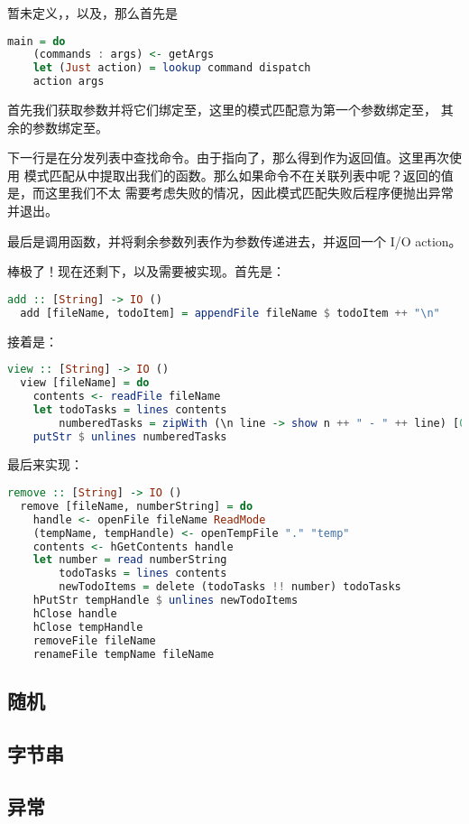 \documentclass[./main.tex]{subfiles}
\begin{document}
暂未定义，，以及，那么首先是

\begin{lstlisting}[language=Haskell]
  main = do
    (commands : args) <- getArgs
    let (Just action) = lookup command dispatch
    action args
\end{lstlisting}

首先我们获取参数并将它们绑定至，这里的模式匹配意为第一个参数绑定至，
其余的参数绑定至。

下一行是在分发列表中查找命令。由于指向了，那么得到作为返回值。这里再次使用
模式匹配从中提取出我们的函数。那么如果命令不在关联列表中呢？返回的值是，而这里我们不太
需要考虑失败的情况，因此模式匹配失败后程序便抛出异常并退出。

最后是调用函数，并将剩余参数列表作为参数传递进去，并返回一个 I/O action。

棒极了！现在还剩下，以及需要被实现。首先是：

\begin{lstlisting}[language=Haskell]
  add :: [String] -> IO ()
  add [fileName, todoItem] = appendFile fileName $ todoItem ++ "\n"
\end{lstlisting}

接着是：

\begin{lstlisting}[language=Haskell]
  view :: [String] -> IO ()
  view [fileName] = do
    contents <- readFile fileName
    let todoTasks = lines contents
        numberedTasks = zipWith (\n line -> show n ++ " - " ++ line) [0 ..] todoTasks
    putStr $ unlines numberedTasks
\end{lstlisting}

最后来实现：

\begin{lstlisting}[language=Haskell]
  remove :: [String] -> IO ()
  remove [fileName, numberString] = do
    handle <- openFile fileName ReadMode
    (tempName, tempHandle) <- openTempFile "." "temp"
    contents <- hGetContents handle
    let number = read numberString
        todoTasks = lines contents
        newTodoItems = delete (todoTasks !! number) todoTasks
    hPutStr tempHandle $ unlines newTodoItems
    hClose handle
    hClose tempHandle
    removeFile fileName
    renameFile tempName fileName
\end{lstlisting}

\subsection*{随机}


\subsection*{字节串}


\subsection*{异常}

\end{document}
